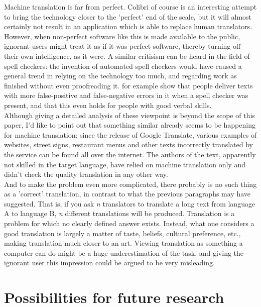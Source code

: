 \documentclass[12pt]{article}
\begin{document}
Machine translation is far from perfect. Colibri of course is an interesting attempt to bring the technology closer to the 'perfect' end of the scale, but it will almost certainly not result in an application which is able to replace human translators. However, when non-perfect software like this is made available to the public, ignorant users might treat it as if it was perfect software, thereby turning off their own intelligence, as it were. A similar critisism can be heard in the field of spell checkers: the invention of automated  spell checkers would have caused a general trend in relying on the technology too much, and regarding work as finished without even proofreading it. \citet{galletta05} for example show that people deliver texts with more false-positive and false-negative errors in it when a spell checker was present, and that this even holds for people with good verbal skills. \\\indent
Although giving a detailed analysis of these viewpoint is beyond the scope of this paper, I'd like to point out that something similar already seems to be happening for machine translation: since the release of Google Translate, various examples of websites, street signs, restaurant menus and other texts incorrectly translated by the service can be found all over the internet. The authors of the text, apparently not skilled in the target language, have relied on machine translation only and didn't check the quality translation in any other way.\\\indent
And to make the problem even more complicated, there probably is no such thing as a 'correct' translation, in contrast to what the previous paragraphs may have suggested. That is, if you ask \emph{n} translators to translate a long text from language A to language B, \emph{n} different translations will be produced. Translation is a problem for which no clearly defined answer exists. Instead, what one considers a good translation is largely a matter of taste, beliefs, cultural preference, etc., making translation much closer to an art. Viewing translation as something a computer can do might be a huge underestimation of the task, and giving the ignorant user this impression could be argued to be very misleading.







\section{Possibilities for future research}
\end{document}
